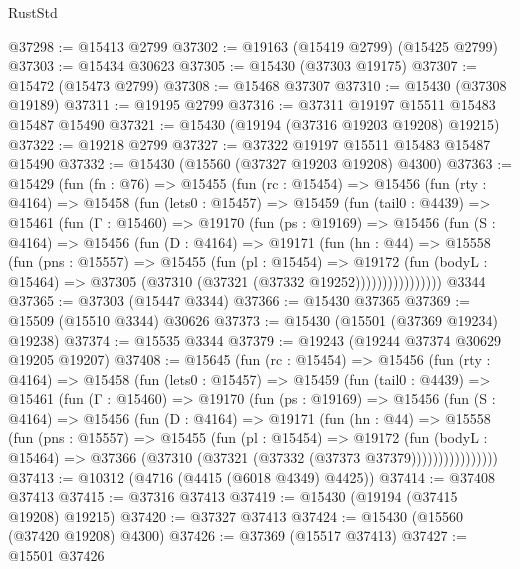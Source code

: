 \begin{lexlean}{RustStd}
\begin{coremodule}
{\begin{coremodule}
{{{{{{{{{{{{{{{{{{{{{{{{{{{{{{{{{{{{{{{{{{{{{{{{{{{{{{{{{{{{@37298 := @15413 @2799
@37302 := @19163 (@15419 @2799) (@15425 @2799)
@37303 := @15434 @30623
@37305 := @15430 (@37303 @19175)
@37307 := @15472 (@15473 @2799)
@37308 := @15468 @37307
@37310 := @15430 (@37308 @19189)
@37311 := @19195 @2799
@37316 := @37311 @19197 @15511 @15483 @15487 @15490
@37321 := @15430 (@19194 (@37316 @19203 @19208) @19215)
@37322 := @19218 @2799
@37327 := @37322 @19197 @15511 @15483 @15487 @15490
@37332 := @15430 (@15560 (@37327 @19203 @19208) @4300)
@37363 := @15429
    (fun (fn : @76) =>
    @15455
      (fun (rc : @15454) =>
      @15456
        (fun (rty : @4164) =>
        @15458
          (fun (lets0 : @15457) =>
          @15459
            (fun (tail0 : @4439) =>
            @15461
              (fun (Γ : @15460) =>
              @19170
                (fun (ps : @19169) =>
                @15456
                  (fun (S : @4164) =>
                  @15456
                    (fun (D : @4164) =>
                    @19171
                      (fun (hn : @44) =>
                      @15558
                        (fun (pns : @15557) =>
                        @15455
                          (fun (pl : @15454) =>
                          @19172
                            (fun (bodyL : @15464) =>
                            @37305 (@37310 (@37321 (@37332 @19252))))))))))))))))
    @3344
@37365 := @37303 (@15447 @3344)
@37366 := @15430 @37365
@37369 := @15509 (@15510 @3344) @30626
@37373 := @15430 (@15501 (@37369 @19234) @19238)
@37374 := @15535 @3344
@37379 := @19243 (@19244 @37374 @30629 @19205 @19207)
@37408 := @15645
    (fun (rc : @15454) =>
    @15456
      (fun (rty : @4164) =>
      @15458
        (fun (lets0 : @15457) =>
        @15459
          (fun (tail0 : @4439) =>
          @15461
            (fun (Γ : @15460) =>
            @19170
              (fun (ps : @19169) =>
              @15456
                (fun (S : @4164) =>
                @15456
                  (fun (D : @4164) =>
                  @19171
                    (fun (hn : @44) =>
                    @15558
                      (fun (pns : @15557) =>
                      @15455
                        (fun (pl : @15454) =>
                        @19172
                          (fun (bodyL : @15464) =>
                          @37366 (@37310 (@37321 (@37332 (@37373 @37379))))))))))))))))
@37413 := @10312 (@4716 (@4415 (@6018 @4349) @4425))
@37414 := @37408 @37413
@37415 := @37316 @37413
@37419 := @15430 (@19194 (@37415 @19208) @19215)
@37420 := @37327 @37413
@37424 := @15430 (@15560 (@37420 @19208) @4300)
@37426 := @37369 (@15517 @37413)
@37427 := @15501 @37426
}}}}}}}}}}}}}}}}}}}}}}}}}}}}}}}}}}}}}}}}}}}}}}}}}}}}}}}}}}}}
\end{coremodule}}
\end{coremodule}
\end{lexlean}

